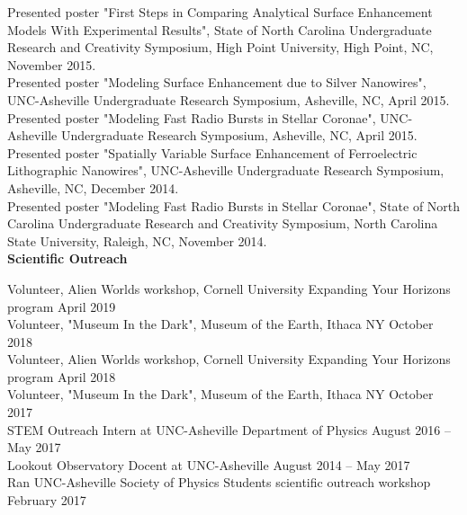 \documentclass[letterpaper, 11pt]{article}
\newcommand{\noi}{\noindent}
\begin{document}
\noi Presented poster "First Steps in Comparing Analytical Surface Enhancement Models With Experimental Results", State of North Carolina Undergraduate Research and Creativity Symposium, High Point University, High Point, NC, November 2015.
\\

\noi Presented poster "Modeling Surface Enhancement due to Silver Nanowires", UNC-Asheville Undergraduate Research Symposium, Asheville, NC, April 2015.
\\

\noi Presented poster "Modeling Fast Radio Bursts in Stellar Coronae", UNC-Asheville Undergraduate Research Symposium, Asheville, NC, April 2015.
\\

\noi Presented poster "Spatially Variable Surface Enhancement of
Ferroelectric Lithographic Nanowires", UNC-Asheville Undergraduate Research Symposium, Asheville, NC, December 2014.
\\

\noi Presented poster "Modeling Fast Radio Bursts in Stellar Coronae", State of North Carolina Undergraduate Research and Creativity Symposium, North Carolina State University, Raleigh, NC, November 2014.
\\

\noi \textbf{Scientific Outreach}

\noi Volunteer, Alien Worlds workshop, Cornell University Expanding Your Horizons program \hfill April 2019
\\

\noi Volunteer, "Museum In the Dark", Museum of the Earth, Ithaca NY \hfill October 2018
\\

\noi Volunteer, Alien Worlds workshop, Cornell University Expanding Your Horizons program \hfill April 2018
\\

\noi Volunteer, "Museum In the Dark", Museum of the Earth, Ithaca NY \hfill October 2017
\\

\noi STEM Outreach Intern at UNC-Asheville Department of Physics \hfill August 2016 -- May 2017
\\

\noi Lookout Observatory Docent at UNC-Asheville \hfill August 2014 -- May 2017
\\

\noi Ran UNC-Asheville Society of Physics Students scientific outreach workshop \hfill February 2017
\\
\end{document}
